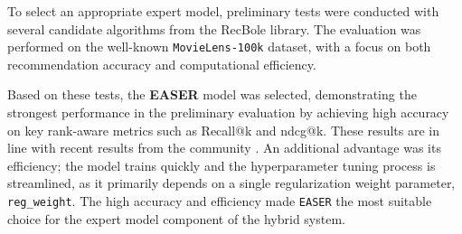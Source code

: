 To select an appropriate expert model, preliminary tests were conducted with several candidate algorithms from the RecBole library. The evaluation was performed on the well-known \texttt{MovieLens-100k} dataset, with a focus on both recommendation accuracy and computational efficiency.

Based on these tests, the \textbf{EASER} model was selected, demonstrating the strongest performance in the preliminary evaluation by achieving high accuracy on key rank-aware metrics such as Recall@k and \acs{ndcg}@k. 
These results are in line with recent results from the community \cite{}. %
An additional advantage was its efficiency; the model trains quickly and the hyperparameter tuning process is streamlined, as it primarily depends on a single regularization weight parameter, \texttt{reg\_weight}. The high accuracy and efficiency made \texttt{EASER} the most suitable choice for the expert model component of the hybrid system.